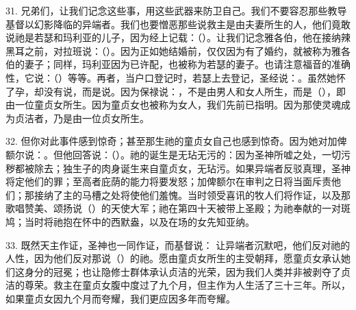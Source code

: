 31. 兄弟们，让我们记念这些事，用这些武器来防卫自己。我们不要容忍那些教导基督以幻影降临的异端者。我们也要憎恶那些说救主是由夫妻所生的人，他们竟敢说祂是若瑟和玛利亚的儿子，因为经上记载：（）。让我们记念雅各伯，他在接纳辣黑耳之前，对拉班说：（）。因为正如她结婚前，仅仅因为有了婚约，就被称为雅各伯的妻子；同样，玛利亚因为已许配，也被称为若瑟的妻子。也请注意福音的准确性，它说：（）等等。再者，当户口登记时，若瑟上去登记，圣经说：。虽然她怀了孕，却没有说，而是说。因为保禄说：，不是由男人和女人所生，而是（），即由一位童贞女所生。因为童贞女也被称为女人，我们先前已指明。因为那使灵魂成为贞洁者，乃是由一位贞女所生。\par

32. 但你对此事件感到惊奇；甚至那生祂的童贞女自己也感到惊奇。因为她对加俾额尔说：。但他回答说：（）。祂的诞生是无玷无污的：因为圣神所嘘之处，一切污秽都被除去；独生子的肉身诞生来自童贞女，无玷污。如果异端者反驳真理，圣神将定他们的罪；至高者庇荫的能力将要发怒；加俾额尔在审判之日将当面斥责他们；那接纳了主的马槽之处将使他们羞愧。当时领受喜讯的牧人们将作证，以及那歌唱赞美、颂扬说（）的天使大军；祂在第四十天被带上圣殿；为祂奉献的一对斑鸠；当时将祂抱在怀中的西默盎，以及在场的女先知亚纳。\par

33. 既然天主作证，圣神也一同作证，而基督说： 让异端者沉默吧，他们反对祂的人性，因为他们反对那说（）的祂。愿由童贞女所生的主受朝拜，愿童贞女承认她们这身分的冠冕；也让隐修士群体承认贞洁的光荣，因为我们人类并非被剥夺了贞洁的尊荣。救主在童贞女腹中度过了九个月，但主作为人生活了三十三年。所以，如果童贞女因九个月而夸耀，我们更应因多年而夸耀。\par

